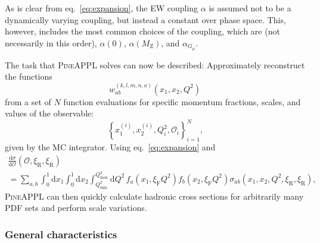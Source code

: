 As is clear from eq.~\eqref{eq:expansion}, the EW coupling $\alpha$ is assumed not to be a dynamically varying coupling, but instead a constant over phase space.
This, however, includes the most common choices of the coupling, which are (not necessarily in this order), $\alpha (0)$, $\alpha (M_\mathrm{Z})$, and $\alpha_{G_\mu}$.

The task that \textsc{PineAPPL} solves can now be described: Approximately reconstruct the functions
\begin{equation}
w_{ab}^{(k,l,m,n,o)} \left( x_1, x_2, Q^2 \right)
\end{equation}
from a set of $N$ function evaluations for specific momentum fractions, scales, and values of the observable:
\begin{equation}
\left\{ x_1^{(i)}, x_2^{(i)}, Q^2_i, \mathcal{O}_i \right\}_{i=1}^N \text{,}
\end{equation}
given by the MC integrator.
Using eq.~\eqref{eq:expansion} and
\begin{multline}
\frac{\mathrm{d} \sigma}{\mathrm{d} \mathcal{O}} (\mathcal{O}, \xi_\mathrm{R}, \xi_\mathrm{R}) \\
= \sum_{a,b} \int_0^1 \mathrm{d} x_1 \int_0^1 \mathrm{d} x_2 \int_{Q^2_\mathrm{min}}^{Q^2_\mathrm{max}} \mathrm{d} Q^2 \, f_a (x_1, \xi_\mathrm{F} Q^2) f_b (x_2, \xi_\mathrm{F} Q^2) \sigma_{ab} (x_1, x_2, Q^2, \xi_\mathrm{R}, \xi_\mathrm{R}) \text{,}
\label{eq:pineappl-convolution}
\end{multline}
\textsc{PineAPPL} can then quickly calculate hadronic cross sections for arbitrarily many PDF sets and perform scale variations.

\subsubsection{General characteristics}

